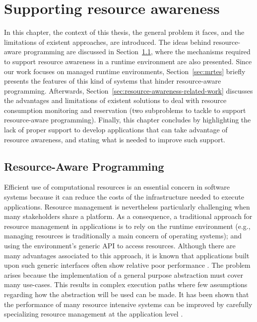\chapter{Supporting resource awareness}
\label{chp:background_resource_awareness}


In this chapter, the context of this thesis, the general problem it faces, and the limitations of existent approaches, are introduced.
The ideas behind resource-aware programming are discussed in Section~\ref{sec:resource-awareness},
where the mechanisms required to support resource awareness in a runtime environment are also presented.
Since our work focuses on managed runtime environments, Section~\ref{sec:mrtes} briefly presents the features of this kind of systems that hinder resource-aware programming.
Afterwards, Section~\ref{sec:resource-awareness-related-work} discusses the advantages and limitations of existent solutions to deal with resource consumption monitoring and reservation (two subproblems to tackle to support resource-aware programming).
Finally, this chapter concludes by highlighting the lack of proper support to develop applications that can take advantage of resource awareness, and stating what is needed to improve such support.

\section{Resource-Aware Programming} \label{sec:resource-awareness}

Efficient use of computational resources is an essential concern in software systems because it can reduce the costs of the infrastructure needed to execute applications.
Resource management is nevertheless particularly challenging when many stakeholders share a platform.
As a consequence, a traditional approach for resource management in applications is to rely on the runtime environment (e.g., managing resources is traditionally a main concern of operating systems); and using the environment's generic API to access resources.
Although there are many advantages associated to this approach, it is known that applications built upon such generic interfaces often show relative poor performance \cite{engler1995exokernel}.
The problem arises because the implementation of a general purpose abstraction must cover many use-cases.
This results in complex execution paths where few assumptions regarding how the abstraction will be used can be made.
It has been shown that the performance of many resource intensive systems can be improved by carefully specializing resource management at the application level \cite{engler1995exokernel,Belay:2014:IPD:2685048.2685053,Marinos:2014:NSS:2619239.2626311}.

